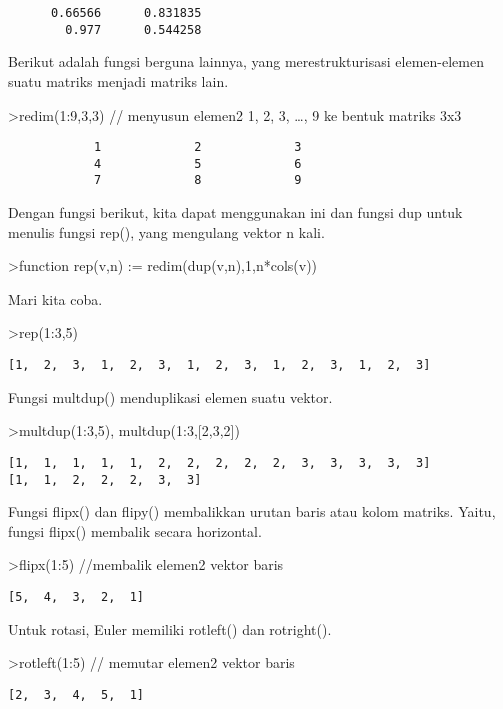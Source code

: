 \documentclass[
]{book}
\begin{document}
\begin{verbatim}
      0.66566      0.831835 
        0.977      0.544258 
\end{verbatim}

Berikut adalah fungsi berguna lainnya, yang merestrukturisasi elemen-elemen suatu matriks menjadi matriks lain.

\textgreater redim(1:9,3,3) // menyusun elemen2 1, 2, 3, \ldots, 9 ke bentuk matriks 3x3

\begin{verbatim}
            1             2             3 
            4             5             6 
            7             8             9 
\end{verbatim}

Dengan fungsi berikut, kita dapat menggunakan ini dan fungsi dup untuk menulis fungsi rep(), yang mengulang vektor n kali.

\textgreater function rep(v,n) := redim(dup(v,n),1,n*cols(v))

Mari kita coba.

\textgreater rep(1:3,5)

\begin{verbatim}
[1,  2,  3,  1,  2,  3,  1,  2,  3,  1,  2,  3,  1,  2,  3]
\end{verbatim}

Fungsi multdup() menduplikasi elemen suatu vektor.

\textgreater multdup(1:3,5), multdup(1:3,{[}2,3,2{]})

\begin{verbatim}
[1,  1,  1,  1,  1,  2,  2,  2,  2,  2,  3,  3,  3,  3,  3]
[1,  1,  2,  2,  2,  3,  3]
\end{verbatim}

Fungsi flipx() dan flipy() membalikkan urutan baris atau kolom matriks. Yaitu, fungsi flipx() membalik secara horizontal.

\textgreater flipx(1:5) //membalik elemen2 vektor baris

\begin{verbatim}
[5,  4,  3,  2,  1]
\end{verbatim}

Untuk rotasi, Euler memiliki rotleft() dan rotright().

\textgreater rotleft(1:5) // memutar elemen2 vektor baris

\begin{verbatim}
[2,  3,  4,  5,  1]
\end{verbatim}
\end{document}
